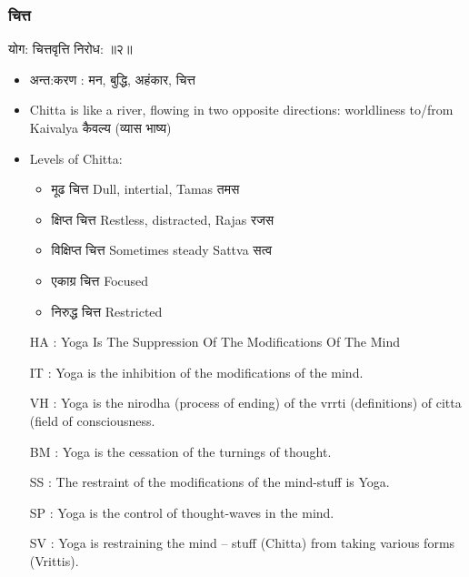 \begin{frame}[fragile]\frametitle{चित्त}

\begin{sanskrit}
योग: चित्तवृत्ति निरोध:  ॥२॥
\end{sanskrit}

	\begin{itemize}
	\item अन्त:करण : मन, बुद्धि, अहंकार, चित्त
	\item Chitta is like a river, flowing in two opposite directions: worldliness to/from Kaivalya कैवल्य (व्यास भाष्य)
	\item Levels of Chitta:
		\begin{itemize}
		\item मूढ चित्त  Dull, intertial, Tamas तमस
		\item क्षिप्त चित्त  Restless, distracted, Rajas  रजस
		\item विक्षिप्त चित्त Sometimes steady Sattva सत्व
		\item एकाग्र चित्त Focused
		\item निरुद्ध चित्त Restricted
		\end{itemize}
	\item [HA]: Yoga Is The Suppression Of The Modifications Of The Mind
	\item [IT]: Yoga is the inhibition of the modifications of the mind.
	\item [VH]: Yoga is the nirodha (process of ending) of the vrrti (definitions) of citta (field of consciousness.
	\item [BM]: Yoga is the cessation of the turnings of thought.
	\item [SS]: The restraint of the modifications of the mind-stuff is Yoga.
	\item [SP]: Yoga is the control of thought-waves in the mind.
	\item [SV]: Yoga is restraining the mind – stuff (Chitta) from taking various forms (Vrittis).
	\end{itemize}

\end{frame}

